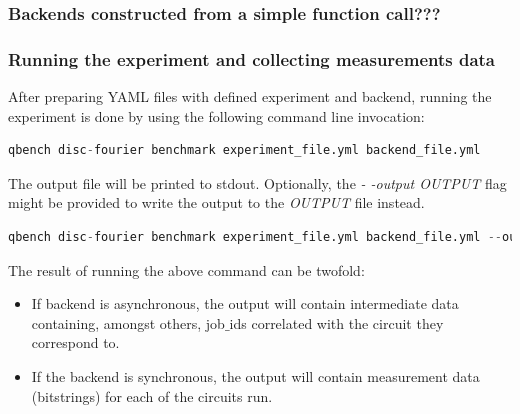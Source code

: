 \documentclass[preprint,12pt, a4paper, dvipsnames]{elsarticle}
\newcommand{\1}{{\rm 1\hspace{-0.9mm}l}}
\begin{document}
\subsubsection{Backends constructed from a simple function call???}

\subsubsection{Running the experiment and collecting measurements data}
After preparing YAML files with defined experiment and backend, 
running the experiment is done by using the following command line invocation:
\begin{lstlisting}[language=Python]
qbench disc-fourier benchmark experiment_file.yml backend_file.yml
\end{lstlisting}
The output file will be printed to stdout. Optionally, the \textit{- -output OUTPUT} flag might be provided to write the output to the \textit{OUTPUT} file instead.
\begin{lstlisting}[language=Python]
qbench disc-fourier benchmark experiment_file.yml backend_file.yml --output async_results.yml
\end{lstlisting}
The result of running the above command can be twofold:
\begin{itemize}
	\item If backend is asynchronous, the output will contain intermediate data containing, amongst others, job$\_$ids correlated with the circuit they correspond to.
	\item If the backend is synchronous, the output will contain measurement data (bitstrings) for each of the circuits run.
\end{itemize}
\end{document}
